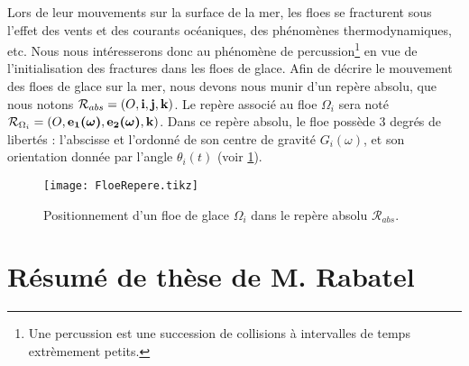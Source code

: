 

Lors de leur mouvements sur la surface de la mer, les floes se fracturent sous l'effet des vents et des courants océaniques, des phénomènes thermodynamiques, etc. Nous nous intéresserons donc au phénomène de percussion\footnote{Une percussion est une succession de collisions à intervalles de temps extrèmement petits.} en vue de l'initialisation des fractures dans les floes de glace. Afin de décrire le mouvement des floes de glace sur la mer, nous devons nous munir d'un repère absolu, que nous notons $\mathcal{R}_{abs} = (O, \bm{\mathrm{i}}, \bm{\mathrm{j}}, \bm{\mathrm{k}})$. Le repère associé au floe $\Omega_i$ sera noté $\mathcal{R}_{\Omega_i} = (O, \bm {\bm{\mathrm{e}}_1(\omega)}, \bm{\mathrm{\bm{\mathrm{e}}_2(\omega)}}, \bm{\mathrm{k}})$. Dans ce repère absolu, le floe possède 3 degrés de libertés : l'abscisse et l'ordonné de son centre de gravité $G_i(\omega)$, et son orientation donnée par l'angle $\theta_i (t)$ (voir \cref{fig:FloeRepere}). 

\begin{figure}[!ht]
    \centering
    \texttt{[image: FloeRepere.tikz]}
    \caption{Positionnement d'un floe de glace $\Omega_i$ dans le repère absolu $\mathcal{R}_{abs}$.}
    \label{fig:FloeRepere}
\end{figure}












\section{Résumé de thèse de M. Rabatel}
\label{sec:thesematthias}










